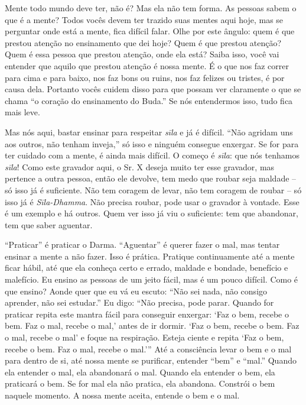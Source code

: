 Mente todo mundo deve ter, não é? Mas ela não tem forma. As pessoas
sabem o que é a mente? Todos vocês devem ter trazido suas mentes aqui
hoje, mas se perguntar onde está a mente, fica difícil falar. Olhe por
este ângulo: quem é que prestou atenção no ensinamento que dei hoje?
Quem é que prestou atenção? Quem é essa pessoa que prestou atenção,
onde ela está? Saiba isso, você vai entender que aquilo que prestou
atenção é nossa mente. É o que nos faz correr para cima e para baixo,
nos faz bons ou ruins, nos faz felizes ou tristes, é por causa dela.
Portanto vocês cuidem disso para que possam ver claramente o que se
chama “o coração do ensinamento do Buda.” Se nós entendermos isso, tudo
fica mais leve.

Mas nós aqui, bastar ensinar para respeitar \textit{sīla} e já é
difícil. “Não agridam uns aos outros, não tenham inveja,” só isso e
ninguém consegue enxergar. Se for para ter cuidado com a mente, é ainda
mais difícil. O começo é \textit{sīla}: que nós tenhamos
\textit{sīla}! Como este gravador aqui, o Sr. X deseja muito ter
esse gravador, mas pertence a outra pessoa, então ele devolve, tem medo
que roubar seja maldade – só isso já é suficiente.
Não tem coragem de levar, não tem coragem de roubar
– só isso já é \textit{Sīla-Dhamma}. Não precisa
roubar, pode usar o gravador à vontade. Esse é um exemplo e há outros.
Quem ver isso já viu o suficiente: tem que abandonar, tem que saber
aguentar. 

“Praticar” é praticar o Darma. “Aguentar” é querer fazer o mal, mas
tentar ensinar a mente a não fazer. Isso é prática. Pratique
continuamente até a mente ficar hábil, até que ela conheça certo e
errado, maldade e bondade, benefício e malefício. Eu ensino as pessoas
de um jeito fácil, mas é um pouco difícil. Como é que ensino? Aonde
quer que eu vá eu escuto: “Não sei nada, não consigo aprender, não sei
estudar.” Eu digo: “Não precisa, pode parar. Quando for praticar repita
este mantra fácil para conseguir enxergar: ‘Faz o bem, recebe o bem.
Faz o mal, recebe o mal,’ antes de ir dormir. ‘Faz o bem, recebe o bem.
Faz o mal, recebe o mal’ e foque na respiração. Esteja ciente e repita
‘Faz o bem, recebe o bem. Faz o mal, recebe o mal.’” Até a consciência
levar o bem e o mal para dentro de si, até nossa mente se purificar,
entender “bem” e “mal.” Quando ela entender o mal, ela abandonará o
mal. Quando ela entender o bem, ela praticará o bem. Se for mal ela não
pratica, ela abandona. Constrói o bem naquele momento. A nossa mente
aceita, entende o bem e o mal. 

